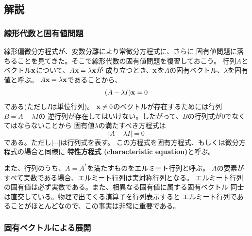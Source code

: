 \subsection{解説}

\subsubsection{線形代数と固有値問題}

線形偏微分方程式が、変数分離により常微分方程式に、さらに
固有値問題に落ちることを見てきた。そこで線形代数の固有値問題を復習しておこう。
行列$A$とベクトル${\bf x}$について、$A {\bf x} = \lambda {\bf x}$が
成り立つとき、${\bf x}$を$A$の固有ベクトル、$\lambda$を固有値と呼ぶ。
$A {\bf x} = \lambda {\bf x}$であることから、
\begin{equation}
  (A - \lambda I) {\bf x} = 0
\end{equation}
である(ただし$I$は単位行列)。
${\bf x} \ne 0$のベクトルが存在するためには行列$B = A - \lambda I$の
逆行列が存在してはいけない。したがって、$B$の行列式が$0$でなくてはならないことから
固有値$\lambda$の満たすべき方程式は
\begin{equation}
  |A - \lambda I|=0
\end{equation}
である。ただし$|\cdots|$は行列式を表す。
この方程式を固有方程式、もしくは微分方程式の場合と同様に
{\bf 特性方程式 (characteristic equation)}と呼ぶ。

また、行列のうち、$A=A^*$を満たすものをエルミート行列と呼ぶ。
$A$の要素がすべて実数である場合、エルミート行列は実対称行列となる。
エルミート行列の固有値は必ず実数である。また、相異なる固有値に属する固有ベクトル
同士は直交している。物理で出てくる演算子を行列表示すると
エルミート行列であることがほとんどなので、この事実は非常に重要である。

\subsubsection{固有ベクトルによる展開}

